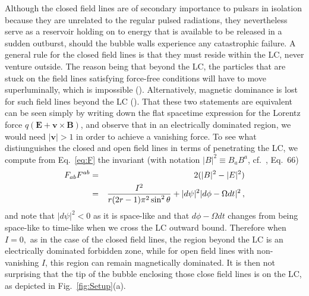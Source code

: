 \documentclass{aa}
\newcommand{\bea}{\begin{eqnarray}}
\newcommand{\eea}{\end{eqnarray}}
\begin{document}
Although the closed field lines are of secondary importance to pulsars in isolation because they are unrelated to the regular pulsed radiations, they nevertheless serve as a reservoir holding on to energy that is available to be released in a sudden outburst, should the bubble walls experience any catastrophic failure. A general rule for the closed field lines is that they must reside within the LC, never venture outside. The reason being that beyond the LC, the particles that are stuck on the field lines satisfying force-free conditions will have to move superluminally, which is impossible (\cite{Goldreich:1969sb}). Alternatively, magnetic dominance is lost for such field lines beyond the LC (\cite{Gralla:2014yja}). That these two statements are equivalent can be seen simply by writing down the flat spacetime expression for the Lorentz force $q(\bm{E}+\bm{v} \times \bm{B})$, and observe that in an electrically dominated region, we would need $|\bm{v}|>1$ in order to achieve a vanishing force. To see what distiunguishes the closed and open field lines in terms of penetrating the LC, we compute from Eq.~\eqref{eq:F} the invariant (with notation $|B|^2 \equiv B_aB^a$, cf.~\cite{Gralla:2014yja}, Eq.~66)
\bea
F_{ab}F^{ab} &=& 2(|B|^2-|E|^2) \notag \\
&=&\frac{I^2}{r(2r-1)\pi^2 \sin^2\theta} + |d\psi|^2|d\phi-\Omega dt|^2\,,
\eea
and note that $|d\psi|^2 < 0$ as it is space-like and that $d\phi-\Omega dt$ changes from being space-like to time-like when we cross the LC outward bound. Therefore when $I=0,$ as in the case of the closed field lines, the region beyond the LC is an electrically dominated forbidden zone, while for open field lines with non-vanishing $I$, this region can remain magnetically dominated. It is then not surprising that the tip of the bubble enclosing those close field lines is on the LC, as depicted in Fig.~\ref{fig:Setup}(a). 
\end{document}

